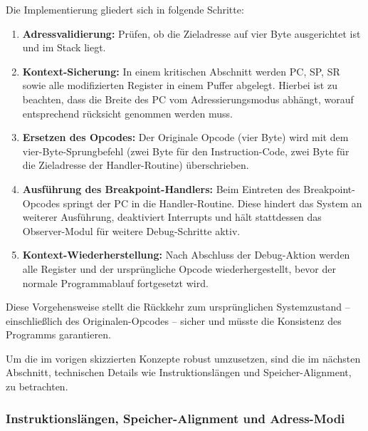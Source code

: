 Die Implementierung gliedert sich in folgende Schritte:
\begin{enumerate}
	\item \textbf{Adressvalidierung:} Pr\"ufen, ob die Zieladresse auf vier Byte ausgerichtet ist und im Stack liegt.
	  
	\item \textbf{Kontext-Sicherung:} In einem kritischen Abschnitt werden PC, SP, SR sowie alle modifizierten Register in einem Puffer abgelegt. Hierbei ist zu beachten, dass die Breite des PC vom Adressierungsmodus abh\"angt, worauf entsprechend r\"ucksicht genommen werden muss. 
	
	\item \textbf{Ersetzen des Opcodes:} Der Originale Opcode (vier Byte) wird mit dem vier-Byte-Sprungbefehl (zwei Byte f\"ur den Instruction-Code, zwei Byte f\"ur die Zieladresse der Handler-Routine) \"uberschrieben. 
	
	\item \textbf{Ausf\"uhrung des Breakpoint-Handlers:} Beim Eintreten des Breakpoint-Opcodes springt der PC in die Handler-Routine. Diese hindert das System an weiterer Ausf\"uhrung, deaktiviert Interrupts und h\"alt stattdessen das Observer-Modul f\"ur weitere Debug-Schritte aktiv.
	
	\item \textbf{Kontext-Wiederherstellung:} Nach Abschluss der Debug-Aktion werden alle Register und der urspr\"ungliche Opcode wiederhergestellt, bevor der normale Programmablauf fortgesetzt wird.
\end{enumerate}

Diese Vorgehensweise stellt die R\"uckkehr zum urspr\"unglichen Systemzustand – einschlie{\ss}lich des Originalen-Opcodes – sicher und m\"usste die Konsistenz des Programms garantieren.

Um die im vorigen  skizzierten Konzepte robust umzusetzen, sind die im n\"achsten Abschnitt, technischen Details wie Instruktionsl\"angen und Speicher-Alignment, zu betrachten.\AI


\newpage
\subsubsection{Instruktionsl\"angen, Speicher-Alignment und Adress-Modi}
\label{sec:TechnischeUmsetzunSoftwareBreakpoints}

